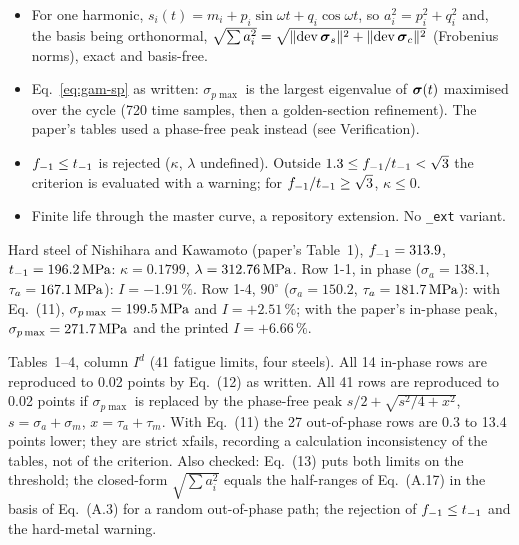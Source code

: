 \begin{itemize}
\item For one harmonic, $s_i(t)=m_i+p_i\sin\omega t+q_i\cos\omega t$, so $a_i^2=p_i^2+q_i^2$ and,
  the basis being orthonormal, $\sqrt{\sum a_i^2}=\sqrt{\lVert\operatorname{dev}\boldsymbol\sigma_s\rVert^2+\lVert\operatorname{dev}\boldsymbol\sigma_c\rVert^2}$
  (Frobenius norms), exact and basis-free.
\item Eq.~\eqref{eq:gam-sp} as written: $\sigma_{p\max}$ is the largest eigenvalue of $\boldsymbol\sigma(t)$
  maximised over the cycle (720 time samples, then a golden-section refinement). The paper's tables
  used a phase-free peak instead (see Verification).
\item $f_{-1}\le t_{-1}$ is rejected ($\kappa$, $\lambda$ undefined). Outside $1.3\le f_{-1}/t_{-1}<\sqrt3$ the
  criterion is evaluated with a warning; for $f_{-1}/t_{-1}\ge\sqrt3$, $\kappa\le0$.
\item Finite life through the master curve, a repository extension. No \texttt{\_ext} variant.
\end{itemize}

 Hard steel of Nishihara and Kawamoto (paper's Table~1), $f_{-1}=313.9$,
$t_{-1}=196.2\,\mathrm{MPa}$: $\kappa=0.1799$, $\lambda=312.76\,\mathrm{MPa}$. Row 1-1, in phase ($\sigma_a=138.1$,
$\tau_a=167.1\,\mathrm{MPa}$): $I=-1.91\,\%$. Row 1-4, $90^\circ$ ($\sigma_a=150.2$, $\tau_a=181.7\,\mathrm{MPa}$): with
Eq.~(11), $\sigma_{p\max}=199.5\,\mathrm{MPa}$ and $I=+2.51\,\%$; with the paper's in-phase peak,
$\sigma_{p\max}=271.7\,\mathrm{MPa}$ and the printed $I=+6.66\,\%$.

 Tables~1--4, column $I^d$ (41 fatigue limits, four steels). All 14 in-phase rows
are reproduced to 0.02 points by Eq.~(12) as written. All 41 rows are reproduced to 0.02 points if
$\sigma_{p\max}$ is replaced by the phase-free peak $s/2+\sqrt{s^2/4+x^2}$, $s=\sigma_a+\sigma_m$,
$x=\tau_a+\tau_m$. With Eq.~(11) the 27 out-of-phase rows are 0.3 to 13.4 points lower; they are
strict xfails, recording a calculation inconsistency of the tables, not of the criterion. Also
checked: Eq.~(13) puts both limits on the threshold; the closed-form $\sqrt{\sum a_i^2}$ equals the
half-ranges of Eq.~(A.17) in the basis of Eq.~(A.3) for a random out-of-phase path; the rejection of
$f_{-1}\le t_{-1}$ and the hard-metal warning.
